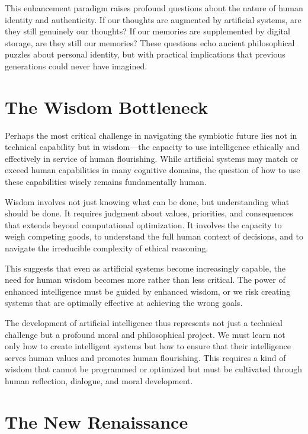 This enhancement paradigm raises profound questions about the nature of human identity and authenticity. If our thoughts are augmented by artificial systems, are they still genuinely our thoughts? If our memories are supplemented by digital storage, are they still our memories? These questions echo ancient philosophical puzzles about personal identity, but with practical implications that previous generations could never have imagined.

\section{The Wisdom Bottleneck}

Perhaps the most critical challenge in navigating the symbiotic future lies not in technical capability but in wisdom—the capacity to use intelligence ethically and effectively in service of human flourishing. While artificial systems may match or exceed human capabilities in many cognitive domains, the question of how to use these capabilities wisely remains fundamentally human.

Wisdom involves not just knowing what can be done, but understanding what should be done. It requires judgment about values, priorities, and consequences that extends beyond computational optimization. It involves the capacity to weigh competing goods, to understand the full human context of decisions, and to navigate the irreducible complexity of ethical reasoning.

This suggests that even as artificial systems become increasingly capable, the need for human wisdom becomes more rather than less critical. The power of enhanced intelligence must be guided by enhanced wisdom, or we risk creating systems that are optimally effective at achieving the wrong goals.

The development of artificial intelligence thus represents not just a technical challenge but a profound moral and philosophical project. We must learn not only how to create intelligent systems but how to ensure that their intelligence serves human values and promotes human flourishing. This requires a kind of wisdom that cannot be programmed or optimized but must be cultivated through human reflection, dialogue, and moral development.

\section{The New Renaissance}


